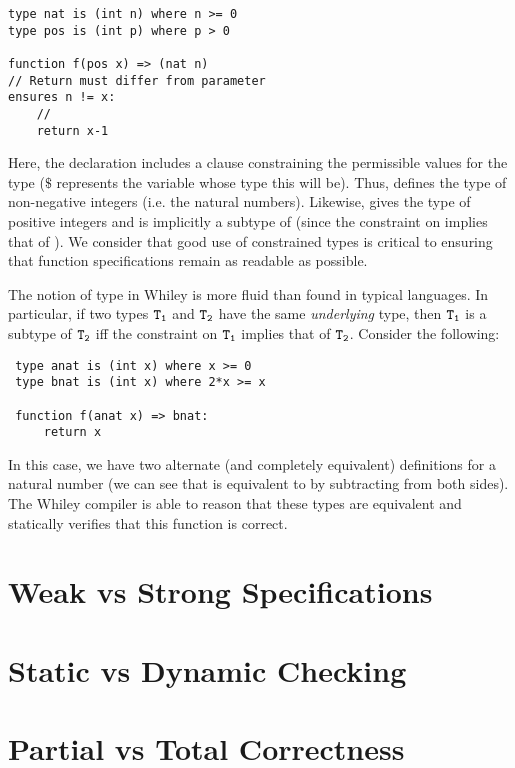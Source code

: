 \begin{lstlisting}
type nat is (int n) where n >= 0
type pos is (int p) where p > 0

function f(pos x) => (nat n)
// Return must differ from parameter
ensures n != x:
    //
    return x-1
\end{lstlisting}

Here, the  declaration includes a 
clause constraining the permissible values for the type ($\$$
represents the variable whose type this will be).  Thus,
 defines the type of non-negative integers (i.e. the
natural numbers).  Likewise,  gives the type of
positive integers and is implicitly a subtype of 
(since the constraint on  implies that of
).  We consider that good use of constrained types is
critical to ensuring that function specifications remain as readable
as possible.

The notion of type in Whiley is more fluid than found in typical
languages.  In particular, if two types ${\tt T_1}$ and ${\tt T_2}$
have the same {\em underlying} type, then ${\tt T_1}$ is a subtype of
${\tt T_2}$ iff the constraint on ${\tt T_1}$ implies that of ${\tt
  T_2}$.  Consider the following:

\begin{lstlisting}
 type anat is (int x) where x >= 0
 type bnat is (int x) where 2*x >= x

 function f(anat x) => bnat:
     return x
\end{lstlisting}
In this case, we have two alternate (and completely equivalent)
definitions for a natural number (we can see that  is
equivalent to  by subtracting  from both sides).
The Whiley compiler is able to reason that these types are equivalent
and statically verifies that this function is correct.

\section{Weak vs Strong Specifications}
\section{Static vs Dynamic Checking}
\section{Partial vs Total Correctness}

